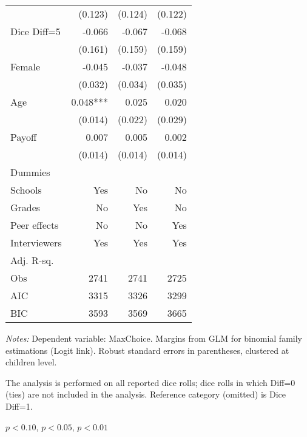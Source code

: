 \begin{table}[htbp]
\begin{threeparttable}
\begin{tabular}{l*{3}{D{.}{.}{-1}}}
                    &             (0.123)   &             (0.124)   &             (0.122)   \\
Dice Diff=5         &              -0.066   &              -0.067   &              -0.068   \\
                    &             (0.161)   &             (0.159)   &             (0.159)   \\
Female              &              -0.045   &              -0.037   &              -0.048   \\
                    &             (0.032)   &             (0.034)   &             (0.035)   \\
Age                 &               0.048***&               0.025   &               0.020   \\
                    &             (0.014)   &             (0.022)   &             (0.029)   \\
Payoff              &               0.007   &               0.005   &               0.002   \\
                    &             (0.014)   &             (0.014)   &             (0.014)   \\
Dummies &&& \\
Schools             &                 Yes   &                  No   &                  No   \\
Grades              &                  No   &                 Yes   &                  No   \\
Peer effects        &                  No   &                  No   &                 Yes   \\
Interviewers        &                 Yes   &                 Yes   &                 Yes   \\
\midrule
Adj. R-sq.          &                       &                       &                       \\
Obs                 &                2741   &                2741   &                2725   \\
AIC                 &                3315   &                3326   &                3299   \\
BIC                 &                3593   &                3569   &                3665   \\
\bottomrule
\end{tabular}
\begin{tablenotes}
\footnotesize
\textit{Notes:} Dependent variable: MaxChoice. Margins from GLM for binomial family estimations (Logit link). Robust standard errors in parentheses, clustered at children level.
\item The analysis is performed on all reported dice rolls; dice rolls in which Diff=0 (ties) are not included in the analysis. Reference category (omitted) is Dice Diff=1.

\item \sym{*} \(p<0.10\), \sym{**} \(p<0.05\), \sym{***} \(p<0.01\)
\end{tablenotes}
\end{threeparttable}
\label{tab:cheat_patterns}
\end{table}
